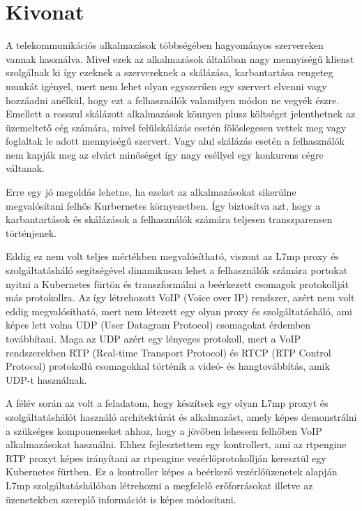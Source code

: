 \setcounter{page}{1}

\selecthungarian

\chapter*{Kivonat}

A telekommunikációs alkalmazások többségében hagyományos szervereken vannak
használva. Mivel ezek az alkalmazások általában nagy mennyiségű klienst szolgálnak 
ki így ezeknek a szervereknek a skálázása, karbantartása rengeteg munkát igényel,
mert nem lehet olyan egyszerűen egy szervert elvenni vagy hozzáadni anélkül, hogy
ezt a felhasználók valamilyen módon ne vegyék észre. Emellett a rosszul skálázott 
alkalmazások könnyen plusz költséget jelenthetnek az üzemeltető cég számára, mivel 
felülskálázás esetén fölöslegesen vettek meg vagy foglaltak le adott mennyiségű 
szervert. Vagy alul skálázás esetén a felhasználók nem kapják meg az elvárt minőséget
így nagy eséllyel egy konkurens cégre váltanak. 

Erre egy jó megoldás lehetne, ha ezeket az alkalmazásokat sikerülne megvalósítani
felhős Kurbernetes környezetben. Így biztosítva azt, hogy a karbantartások és
skálázások a felhasználók számára teljesen transzparensen történjenek.

Eddig ez nem volt teljes mértékben megvalósítható, viszont az L7mp proxy és 
szolgáltatásháló segítségével dinamikusan lehet a felhasználók számára portokat
nyitni a Kubernetes fürtön és transzformálni a beérkezett csomagok protokollját 
más protokollra. Az így létrehozott VoIP (Voice over IP) rendszer, azért nem volt eddig megvalósítható, mert nem létezett egy olyan
proxy és szolgáltatásháló, ami képes lett volna UDP (User Datagram Protocol) 
csomagokat érdemben továbbítani. Maga az UDP azért egy lényeges protokoll, mert a 
VoIP rendszerekben RTP (Real-time Transport Protocol) és 
RTCP (RTP Control Protocol) protokollú csomagokkal történik a videó- és 
hangtovábbítás, amik UDP-t használnak.

A félév során az volt a feladatom, hogy készítsek egy olyan L7mp proxyt és 
szolgáltatáshálót használó architektúrát és alkalmazást, amely képes demonstrálni
a szükséges komponenseket ahhoz, hogy a jövőben lehessen felhőben VoIP 
alkalmazásokat használni. Ehhez fejlesztettem egy kontrollert, ami az rtpengine
RTP proxyt képes irányítani az rtpengine vezérlőprotokollján keresztül egy
Kubernetes fürtben. Ez a kontroller képes a beérkező vezérlőüzenetek alapján 
L7mp szolgáltatáshálóban létrehozni a megfelelő erőforrásokat illetve az üzenetekben
szereplő információt is képes módosítani. 

